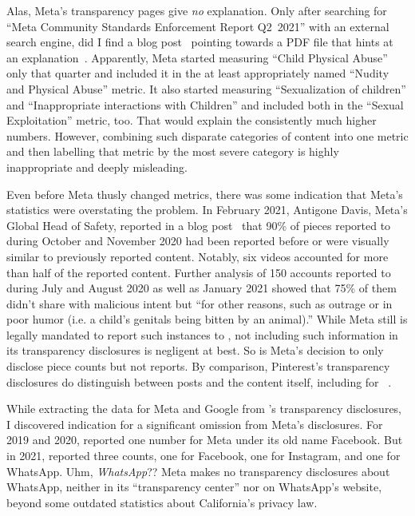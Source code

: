 Alas, Meta's transparency pages give \emph{no} explanation. Only after searching
for ``Meta Community Standards Enforcement Report Q2~2021'' with an external
search engine, did I find a blog post~\cite{Facebook2021a} pointing towards a
PDF file that hints at an explanation~\cite{Facebook2021}. Apparently, Meta
started measuring ``Child Physical Abuse'' only that quarter and included it in
the at least appropriately named ``Nudity and Physical Abuse'' metric. It also
started measuring ``Sexualization of children'' and ``Inappropriate interactions
with Children'' and included both in the ``Sexual Exploitation'' metric, too.
That would explain the consistently much higher numbers. However, combining such
disparate categories of content into one metric and then labelling that metric
by the most severe category is highly inappropriate and deeply misleading.

Even before Meta thusly changed metrics, there was some indication that Meta's
statistics were overstating the problem. In February 2021, Antigone Davis,
Meta's Global Head of Safety, reported in a blog post~\cite{Davis2021} that 90\%
of pieces reported to  during October and November 2020 had been reported
before or were visually similar to previously reported content. Notably, six
videos accounted for more than half of the reported content. Further analysis of
150 accounts reported to  during July and August 2020 as well as January
2021 showed that 75\% of them didn't share  with malicious intent but
``for other reasons, such as outrage or in poor humor (i.e. a child's genitals
being bitten by an animal).'' While Meta still is legally mandated to report
such instances to , not including such information in its transparency
disclosures is negligent at best. So is Meta's decision to only disclose piece
counts but not reports. By comparison, Pinterest's transparency disclosures do
distinguish between posts and the content itself, including for
~\cite{Pinterest2022}.

While extracting the data for Meta and Google from 's transparency
disclosures, I discovered indication for a significant omission from Meta's
disclosures. For 2019 and 2020,  reported one number for Meta under its
old name Facebook. But in 2021,  reported three counts, one for Facebook,
one for Instagram, and one for WhatsApp. Uhm, \emph{WhatsApp}?? Meta makes no
transparency disclosures about WhatsApp, neither in its ``transparency center''
nor on WhatsApp's website, beyond some outdated statistics about California's
privacy law.

